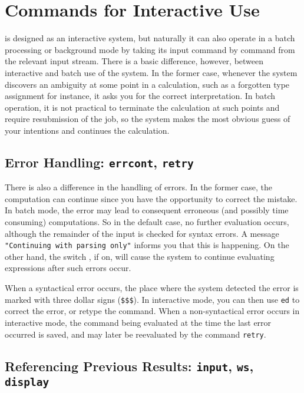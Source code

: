 \chapter{Commands for Interactive Use}
\label{interactive}

{\REDUCE} is designed as an interactive system, but naturally it can
also operate in a batch processing or background mode by taking its
input command by command from the relevant input stream.  There is a
basic difference, however, between interactive and batch use of the
system.  In the former case, whenever the system discovers an
ambiguity at some point in a calculation, such as a forgotten type
assignment for instance, it asks you for the correct interpretation.
In batch operation, it is not practical to terminate the calculation
at such points and require resubmission of the job, so the system
makes the most obvious guess of your intentions and continues the
calculation.

\section{Error Handling:
  \texttt{\small errcont}, \texttt{\small retry}}

\hypertarget{switch:ERRCONT}{}
There is also a difference in the handling of errors.  In the former
case, the computation can continue since you have the opportunity to
correct the mistake.  In batch mode, the error may lead to consequent
erroneous (and possibly time consuming) computations.  So in the
default case, no further evaluation occurs, although the remainder of
the input is checked for syntax errors.  A message \texttt{"Continuing
  with parsing only"} informs you that this is happening.  On the
other hand, the switch , if on,
will cause the system to continue evaluating expressions after such
errors occur.

\hypertarget{command:RETRY}{}
When a syntactical error occurs, the place where the system detected
the error is marked with three dollar signs (\texttt{\$\$\$}). In
interactive mode, you can then use \texttt{ed} to correct
the error, or retype the command.  When a non-syntactical error occurs
in interactive mode, the command being evaluated at the time the last
error occurred is saved, and may later be reevaluated by the command
\texttt{retry}.

\section{Referencing Previous Results:
  \texttt{\small input}, \texttt{\small ws}, \texttt{\small display}}

